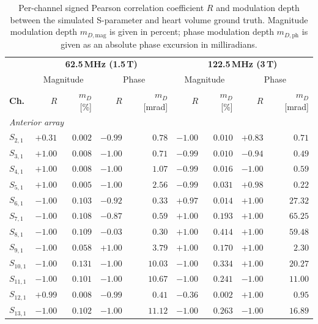 \documentclass[
]{article}
\begin{document}
\begin{table}[ht]
\centering

\caption{Per-channel signed Pearson correlation coefficient $R$ and modulation depth between the simulated S-parameter and heart volume ground truth. Magnitude modulation depth $m_{D,\text{mag}}$ is given in percent; phase modulation depth $m_{D,\text{ph}}$ is given as an absolute phase excursion in milliradians.}
\label{tab:per-channel}
\scriptsize
\begin{tabular}{l|rr|rr|rr|rr}
\hline
 & \multicolumn{4}{c|}{\textbf{62.5\,MHz (1.5\,T)}} & \multicolumn{4}{c}{\textbf{122.5\,MHz (3\,T)}} \\
 & \multicolumn{2}{c|}{Magnitude} & \multicolumn{2}{c|}{Phase} & \multicolumn{2}{c|}{Magnitude} & \multicolumn{2}{c}{Phase} \\
\textbf{Ch.} & $R$ & $m_D$ [\%] & $R$ & $m_D$ [mrad] & $R$ & $m_D$ [\%] & $R$ & $m_D$ [mrad] \\
\hline
\multicolumn{9}{l}{\textit{Anterior array}} \\
\hline
$S_{2,1}$  & $+0.31$ & $0.002$ & $-0.99$ & $0.78$ & $-1.00$ & $0.010$ & $+0.83$ & $0.71$ \\
$S_{3,1}$  & $+1.00$ & $0.008$ & $-1.00$ & $0.71$ & $-0.99$ & $0.010$ & $-0.94$ & $0.49$ \\
$S_{4,1}$  & $+1.00$ & $0.008$ & $-1.00$ & $1.07$ & $-0.99$ & $0.016$ & $-1.00$ & $0.59$ \\
$S_{5,1}$  & $+1.00$ & $0.005$ & $-1.00$ & $2.56$ & $-0.99$ & $0.031$ & $+0.98$ & $0.22$ \\
$S_{6,1}$  & $-1.00$ & $0.103$ & $-0.92$ & $0.33$ & $+0.97$ & $0.014$ & $+1.00$ & $27.32$ \\
$S_{7,1}$  & $-1.00$ & $0.108$ & $-0.87$ & $0.59$ & $+1.00$ & $0.193$ & $+1.00$ & $65.25$ \\
$S_{8,1}$  & $-1.00$ & $0.109$ & $-0.03$ & $0.30$ & $+1.00$ & $0.414$ & $+1.00$ & $59.48$ \\
$S_{9,1}$  & $-1.00$ & $0.058$ & $+1.00$ & $3.79$ & $+1.00$ & $0.170$ & $+1.00$ & $2.30$ \\
$S_{10,1}$ & $-1.00$ & $0.131$ & $-1.00$ & $10.03$ & $-1.00$ & $0.334$ & $+1.00$ & $20.27$ \\
$S_{11,1}$ & $-1.00$ & $0.101$ & $-1.00$ & $10.67$ & $-1.00$ & $0.241$ & $-1.00$ & $11.00$ \\
$S_{12,1}$ & $+0.99$ & $0.008$ & $-0.99$ & $0.41$ & $-0.36$ & $0.002$ & $+1.00$ & $0.95$ \\
$S_{13,1}$ & $-1.00$ & $0.102$ & $-1.00$ & $11.12$ & $-1.00$ & $0.263$ & $-1.00$ & $16.89$ \\

\end{tabular}
\end{table}
\end{document}
